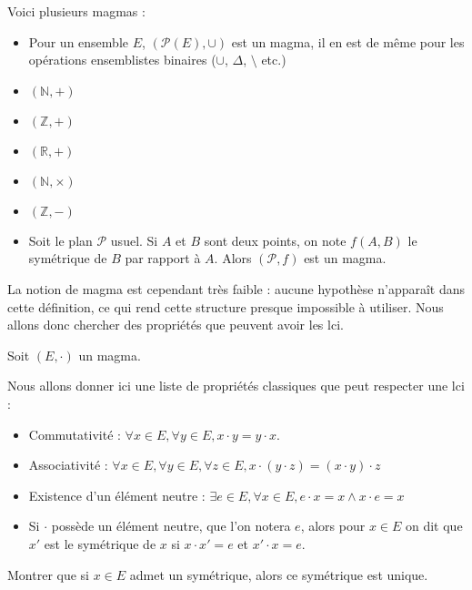 \begin{expl}\label{expl:magmas}
    Voici plusieurs magmas :
    \begin{itemize}[label=$\bullet$]
        \item Pour un ensemble $E$, $(\mathcal P(E),\cup)$ est un magma, il en est de même pour les opérations ensemblistes binaires ($\cup$, $\Delta$, $\setminus$ etc.)
        \item $(\mathbb N,+)$
        \item $(\mathbb Z,+)$
        \item $(\mathbb R,+)$
        \item $(\mathbb N,\times)$ 
        \item $(\mathbb Z,-)$
        \item Soit le plan $\mathcal P$ usuel. Si $A$ et $B$ sont deux points, on note $f(A,B)$ le symétrique de $B$ par rapport à $A$. Alors $(\mathcal P,f)$ est un magma.
    \end{itemize}
\end{expl}

La notion de magma est cependant très faible : aucune hypothèse n'apparaît dans cette définition, ce qui rend cette structure presque impossible à utiliser. Nous allons donc chercher des propriétés que peuvent avoir les lci.

\begin{defi}
    Soit $(E,\cdot)$ un magma.

    Nous allons donner ici une liste de propriétés classiques que peut respecter une lci :
    \begin{itemize}[label = $\bullet$]
        \item Commutativité : $\forall x\in E, \forall y\in E, x \cdot y = y\cdot x$.
        \item Associativité : $\forall x\in E, \forall y\in E, \forall z \in E, x\cdot (y\cdot z) = (x\cdot y)\cdot z$
        \item Existence d'un élément neutre : $\exists e\in E, \forall x \in E, e\cdot x = x \land x\cdot e = x$
        \item Si $\cdot$ possède un élément neutre, que l'on notera $e$, alors pour $x\in E$ on dit que $x'$ est le symétrique de $x$ si $x\cdot x' = e$ et $x'\cdot x = e$.
    \end{itemize}
\end{defi}

\begin{exo}
    Montrer que si $x\in E$ admet un symétrique, alors ce symétrique est unique.
\end{exo}

